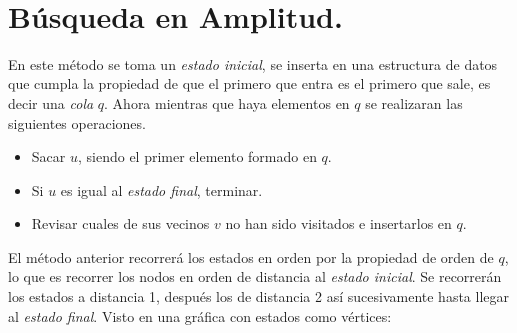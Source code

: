 \documentclass[12pt]{article}
\def \L {2.}
\begin{document}
	\\
	\pagebreak
	\section{Búsqueda en Amplitud.}
	En este método se toma un \textit{estado inicial}, se inserta en una estructura de datos que cumpla la propiedad de que el primero que entra es el primero que sale, es decir una \textit{cola} $q$.
	Ahora mientras que haya elementos en $q$ se realizaran las siguientes operaciones.
	\begin{itemize}
		\item Sacar $u$, siendo el primer elemento formado en $q$.
		\item Si $u$ es igual al \textit{estado final}, terminar.
		\item Revisar cuales de sus vecinos $v$ no han sido visitados e insertarlos en $q$.
	\end{itemize}
	El método anterior recorrerá los estados en orden por la propiedad de orden de $q$, lo que es recorrer los nodos en orden de distancia al \textit{estado inicial}. Se recorrerán los estados a distancia 1, después los de distancia 2 así sucesivamente hasta llegar al \textit{estado final}. Visto en una gráfica con estados como vértices:\\
	\pagebreak
\end{document}
